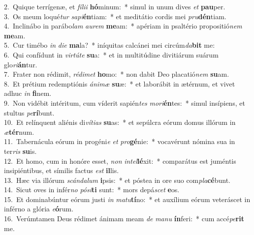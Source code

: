 {2.~}Quique terrígenæ, et \textit{fí}\textit{li}\textit{i} \textbf{hó}minum:~* simul in unum dives \textit{et} \textbf{pau}per.\\
{3.~}Os meum loqué\textit{tur} \textit{sa}\textit{pi}\textbf{én}tiam:~* et meditátio cordis mei \textit{pru}\textbf{dén}tiam.\\
{4.~}Inclinábo in parábo\textit{lam} \textit{au}\textit{rem} \textbf{me}am:~* apériam in psaltério propositió\textit{nem} \textbf{me}am.\\
{5.~}Cur timébo \textit{in} \textit{di}\textit{e} \textbf{ma}la?~* iníquitas calcánei mei circúm\textit{da}\textbf{bit} me:\\
{6.~}Qui confídunt in \textit{vir}\textit{tú}\textit{te} \textbf{su}a:~* et in multitúdine divitiárum suárum glo\textit{ri}\textbf{án}tur.\\
{7.~}Frater non rédimit, \textit{ré}\textit{di}\textit{met} \textbf{ho}mo:~* non dabit Deo placatió\textit{nem} \textbf{su}am.\\
{8.~}Et prétium redemptiónis \textit{á}\textit{ni}\textit{mæ} \textbf{su}æ:~* et laborábit in ætérnum, et vivet adhuc \textit{in} \textbf{fi}nem.\\
{9.~}Non vidébit intéritum, cum víderit sapién\textit{tes} \textit{mo}\textit{ri}\textbf{én}tes:~* simul insípiens, et stultus \textit{pe}\textbf{rí}bunt.\\
{10.~}Et relínquent aliénis di\textit{ví}\textit{ti}\textit{as} \textbf{su}as:~* et sepúlcra eórum domus illórum in \textit{æ}\textbf{tér}num.\\
{11.~}Tabernácula eórum in progéni\textit{e} \textit{et} \textit{pro}\textbf{gé}nie:~* vocavérunt nómina sua in ter\textit{ris} \textbf{su}is.\\
{12.~}Et homo, cum in honóre esset, \textit{non} \textit{in}\textit{tel}\textbf{lé}xit:~* comparátus est juméntis insipiéntibus, et símilis factus \textit{est} \textbf{il}lis.\\
{13.~}Hæc via illórum \textit{scán}\textit{da}\textit{lum} \textbf{i}psis:~* et póstea in ore suo com\textit{pla}\textbf{cé}bunt.\\
{14.~}Sicut oves in infér\textit{no} \textit{pó}\textit{si}\textbf{ti} sunt:~* mors depá\textit{scet} \textbf{e}os.\\
{15.~}Et dominabúntur eórum justi \textit{in} \textit{ma}\textit{tu}\textbf{tí}no:~* et auxílium eórum veteráscet in inférno a glória \textit{e}\textbf{ó}rum.\\
{16.~}Verúmtamen Deus rédimet ánimam meam \textit{de} \textit{ma}\textit{nu} \textbf{ín}feri:~* cum accé\textit{pe}\textbf{rit} me.\\

